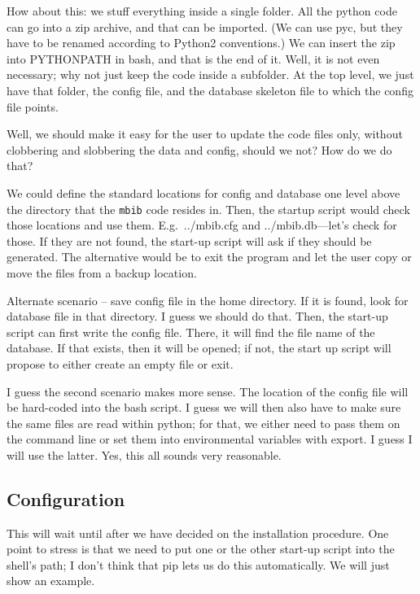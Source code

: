 \documentclass[10pt]{article}
\newcommand{\mbib}{\texttt{mbib}\xspace}
\begin{document}
How about this: we stuff everything inside a single folder. All the python code can go into a zip archive, and that can be imported. (We can use pyc, but they have to be renamed according to Python2 conventions.) We can insert the zip into PYTHONPATH in bash, and that is the end of it. Well, it is not even necessary; why not just keep the code inside a subfolder. At the top level, we just have that folder, the config file, and the database skeleton file to which the config file points. 

Well, we should make it easy for the user to update the code files only, without clobbering and slobbering the data and config, should we not? How do we do that?

We could define the standard locations for config and database one level above the directory that the \mbib code resides in. Then, the startup script would check those locations and use them. E.g.\ ../mbib.cfg and ../mbib.db---let's check for those. If they are not found, the start-up script will ask if they should be generated. The alternative would be to exit the program and let the user copy or move the files from a backup location. 

Alternate scenario -- save config file in the home directory. If it is found, look for database file in that directory. I guess we should do that. Then, the start-up script can first write the config file. There, it will find the file name of the database. If that exists, then it will be opened; if not, the start up script will propose to either create an empty file or exit. 

I guess the second scenario makes more sense. The location of the config file will be hard-coded into the bash script. I guess we will then also have to make sure the same files are read within python; for that, we either need to pass them on the command line or set them into environmental variables with export. I guess I will use the latter. Yes, this all sounds very reasonable. 



\subsection{Configuration}

This will wait until after we have decided on the installation procedure. One point to stress is that we need to put one or the other start-up script into the shell's path; I don't think that pip lets us do this automatically. We will just show an example. 
\end{document}

